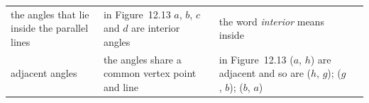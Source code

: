 \begin{center}
\begin{xtabular*}{\mytablewidth}[t]{|p{3cm}|p{3cm}|p{3cm}|p{20\mystarwidth}|}
        the angles that lie inside the parallel lines &
    
    
        in Figure~12.13 \begin{math}a\end{math}, \begin{math}b\end{math}, \begin{math}c\end{math} and \begin{math}d\end{math} are interior angles &
    
    
        the word \textsl{interior} means inside%
     \tabularnewline{}
    
    
        adjacent angles &
    
    
        the angles share a common vertex point and line &
    
    
        in Figure~12.13 (\begin{math}a\end{math}, \begin{math}h\end{math}) are adjacent and so are (\begin{math}h\end{math}, \begin{math}g\end{math}); (\begin{math}g\end{math}, \begin{math}b\end{math}); (\begin{math}b\end{math}, \begin{math}a\end{math}) &
    

\end{xtabular*}
\end{center}

